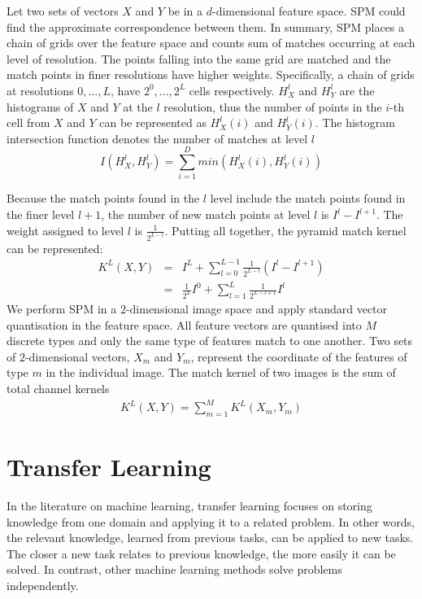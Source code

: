 Let two sets of vectors $X$ and $Y$ be in a $d$-dimensional feature space. SPM could find the approximate correspondence between them. In summary, SPM places a chain of grids over the feature space and counts sum of matches occurring at each level of resolution. The points falling into the same grid are matched and the match points in finer resolutions have higher weights. Specifically, a chain of grids at resolutions $0,\dotso,L$, have $2^0,\dotso,2^L$ cells respectively. $H_{X}^l$ and $H_{Y}^l$ are the histograms of $X$ and $Y$ at the $l$ resolution, thus the number of points in the $i$-th cell from $X$ and $Y$ can be represented as $H_{X}^l(i)$ and $H_{Y}^l(i)$. The histogram intersection function denotes the number of matches at level $l$
\begin{equation}\label{eq:HistInterFunc}
I(H_{X}^l, H_{Y}^l) = \sum_{i=1}^D min(H_{X}^l(i), H_{Y}^l(i))
\end{equation}

Because the match points found in the $l$ level include the match points found in the finer level $l+1$, the number of new match points at level $l$ is $I^l - I^{l+1}$. The weight assigned to level $l$ is $\frac{1}{2^{L-l}}$. Putting all together, the pyramid match kernel can be represented:
\begin{eqnarray}\label{eq:PyramidChanMatchKernel}
  K^L(X,Y) & = & I^L + \sum_{l=0}^{L-1} \frac{1}{2^{L-l}}(I^l-I^{l+1})\\
 & = & \frac{1}{2^L}I^0 + \sum_{l=1}^{L}\frac{1}{2^{L-l+1}}I^l
\end{eqnarray}
We perform SPM in a $2$-dimensional image space and apply standard vector quantisation in the feature space. All feature vectors are quantised into $M$ discrete types and only the same type of features match to one another. Two sets of $2$-dimensional vectors, $X_m$ and $Y_m$, represent the coordinate of the features of type $m$ in the individual image. The match kernel of two images is the sum of total channel kernels
\begin{eqnarray}\label{eq:PyramidMatchKernel}
  K^L(X,Y) = \sum_{m=1}^{M} K^L(X_m, Y_m)
\end{eqnarray}

\section{Transfer Learning}

In the literature on machine learning, transfer learning \citep{pan2010survey} focuses on storing knowledge from one domain and applying it to a related problem. In other words, the relevant knowledge, learned from previous tasks, can be applied to new tasks. The closer a new task relates to previous knowledge, the more easily it can be solved. In contrast, other machine learning methods solve problems independently. 

